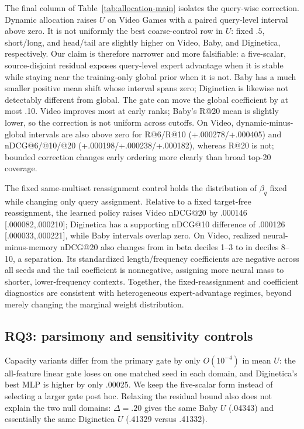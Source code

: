 \documentclass[runningheads]{llncs}
\begin{document}
The final column of Table~\ref{tab:allocation-main} isolates the query-wise
correction. Dynamic allocation raises $U$ on Video Games with a paired
query-level interval above zero. It is not uniformly the best coarse-control
row in $U$: fixed $.5$, short/long, and head/tail are slightly higher on
Video, Baby, and Diginetica, respectively. Our claim is therefore narrower and
more falsifiable: a five-scalar, source-disjoint residual exposes query-level
expert advantage when it is stable while staying near the training-only global
prior when it is not. Baby has a much smaller positive mean shift whose interval
spans zero; Diginetica is likewise not detectably different from global. The gate can move
the global coefficient by at most .10. Video improves most at early ranks;
Baby's R@20 mean is slightly lower, so the correction is not uniform across
cutoffs.
On Video, dynamic-minus-global intervals are also above zero for R@6/R@10
(+.000278/+.000405) and nDCG@6/@10/@20
(+.000198/+.000238/+.000182), whereas R@20 is not; bounded correction changes
early ordering more clearly than broad top-20 coverage.

The fixed same-multiset reassignment control holds the distribution of
$\beta_q$ fixed while changing only query assignment. Relative to a fixed target-free
reassignment, the learned policy raises Video nDCG@20 by .000146
[.000082,.000210]; Diginetica has a supporting nDCG@10 difference of .000126
[.000033,.000221], while Baby intervals overlap zero. On Video, realized
neural-minus-memory nDCG@20 also changes from
\DynamicVideoLowBetaAdv{} in beta deciles 1--3 to
\DynamicVideoHighBetaAdv{} in deciles 8--10, a
\DynamicVideoAllocationGap{} separation. Its standardized length/frequency
coefficients are negative across all seeds and the tail coefficient is
nonnegative, assigning more neural mass to shorter, lower-frequency contexts.
Together, the fixed-reassignment and coefficient diagnostics are consistent
with heterogeneous expert-advantage regimes, beyond merely changing the
marginal weight distribution.

\subsection{RQ3: parsimony and sensitivity controls}
Capacity variants differ from the primary gate by only $O(10^{-4})$ in mean
$U$: the all-feature linear gate loses on one matched seed in each domain, and
Diginetica's best MLP is higher by only .00025. We keep the five-scalar form
instead of selecting a larger gate post hoc. Relaxing the residual bound also
does not explain the two null domains: $\Delta=.20$ gives the same Baby $U$
(.04343) and essentially the same Diginetica $U$ (.41329 versus .41332).
\end{document}
